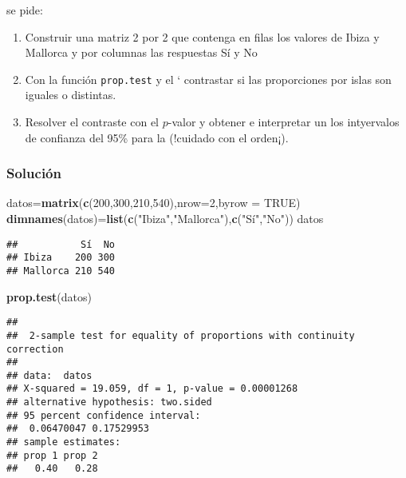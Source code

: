 \documentclass[
]{article}
\newenvironment{Shaded}{\begin{snugshade}}{\end{snugshade}}
\newcommand{\DataTypeTok}[1]{\textcolor[rgb]{0.13,0.29,0.53}{#1}}
\newcommand{\DecValTok}[1]{\textcolor[rgb]{0.00,0.00,0.81}{#1}}
\newcommand{\KeywordTok}[1]{\textcolor[rgb]{0.13,0.29,0.53}{\textbf{#1}}}
\newcommand{\NormalTok}[1]{#1}
\newcommand{\OtherTok}[1]{\textcolor[rgb]{0.56,0.35,0.01}{#1}}
\newcommand{\StringTok}[1]{\textcolor[rgb]{0.31,0.60,0.02}{#1}}
\providecommand{\tightlist}{%
  \setlength{\itemsep}{0pt}\setlength{\parskip}{0pt}}
\begin{document}
se pide:

\begin{enumerate}
\def\labelenumi{\arabic{enumi}.}
\tightlist
\item
  Construir una matriz 2 por 2 que contenga en filas los valores de
  Ibiza y Mallorca y por columnas las respuestas Sí y No
\item
  Con la función \texttt{prop.test} y el ` contrastar si las
  proporciones por islas son iguales o distintas.\\
\item
  Resolver el contraste con el \(p\)-valor y obtener e interpretar un
  los intyervalos de confianza del 95\% para la
   (!cuidado con el orden¡).
\end{enumerate}

\hypertarget{soluciuxf3n-3}{%
\subsubsection{Solución}\label{soluciuxf3n-3}}

\begin{Shaded}
\begin{Highlighting}[]
\NormalTok{datos=}\KeywordTok{matrix}\NormalTok{(}\KeywordTok{c}\NormalTok{(}\DecValTok{200}\NormalTok{,}\DecValTok{300}\NormalTok{,}\DecValTok{210}\NormalTok{,}\DecValTok{540}\NormalTok{),}\DataTypeTok{nrow=}\DecValTok{2}\NormalTok{,}\DataTypeTok{byrow =} \OtherTok{TRUE}\NormalTok{)}
\KeywordTok{dimnames}\NormalTok{(datos)=}\KeywordTok{list}\NormalTok{(}\KeywordTok{c}\NormalTok{(}\StringTok{"Ibiza"}\NormalTok{,}\StringTok{"Mallorca"}\NormalTok{),}\KeywordTok{c}\NormalTok{(}\StringTok{"Sí"}\NormalTok{,}\StringTok{"No"}\NormalTok{))}
\NormalTok{datos}
\end{Highlighting}
\end{Shaded}

\begin{verbatim}
##           Sí  No
## Ibiza    200 300
## Mallorca 210 540
\end{verbatim}

\begin{Shaded}
\begin{Highlighting}[]
\KeywordTok{prop.test}\NormalTok{(datos)}
\end{Highlighting}
\end{Shaded}

\begin{verbatim}
## 
##  2-sample test for equality of proportions with continuity correction
## 
## data:  datos
## X-squared = 19.059, df = 1, p-value = 0.00001268
## alternative hypothesis: two.sided
## 95 percent confidence interval:
##  0.06470047 0.17529953
## sample estimates:
## prop 1 prop 2 
##   0.40   0.28
\end{verbatim}
\end{document}
